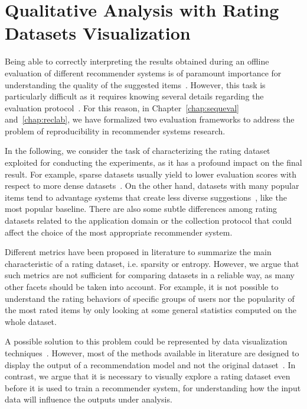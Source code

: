 \chapter{Qualitative Analysis with Rating Datasets Visualization}
\graphicspath{{Chapter06/Figures/}}
\label{chap:rs-viz}

Being able to correctly interpreting the results obtained during an offline evaluation of different recommender systems is of paramount importance for understanding the quality of the suggested items~\cite{Ge2010}. However, this task is particularly difficult as it requires knowing several details regarding the evaluation protocol~\cite{Said2014}. For this reason, in Chapter~\ref{chap:sequeval} and~\ref{chap:reclab}, we have formalized two evaluation frameworks to address the problem of reproducibility in recommender systems research.

In the following, we consider the task of characterizing the rating dataset exploited for conducting the experiments, as it has a profound impact on the final result. For example, sparse datasets usually yield to lower evaluation scores with respect to more dense datasets~\cite{Cremonesi2010}. On the other hand, datasets with many popular items tend to advantage systems that create less diverse suggestions~\cite{Vargas2011}, like the most popular baseline. There are also some subtle differences among rating datasets related to the application domain or the collection protocol that could affect the choice of the most appropriate recommender system.

Different metrics have been proposed in literature to summarize the main characteristic of a rating dataset, i.e. sparsity or entropy. However, we argue that such metrics are not sufficient for comparing datasets in a reliable way, as many other facets should be taken into account. For example, it is not possible to understand the rating behaviors of specific groups of users nor the popularity of the most rated items by only looking at some general statistics computed on the whole dataset.

A possible solution to this problem could be represented by data visualization techniques~\cite{Kunkel2017}. However, most of the methods available in literature are designed to display the output of a recommendation model and not the original dataset~\cite{Gil2018,Cardoso2019}. In contrast, we argue that it is necessary to visually explore a rating dataset even before it is used to train a recommender system, for understanding how the input data will influence the outputs under analysis.

